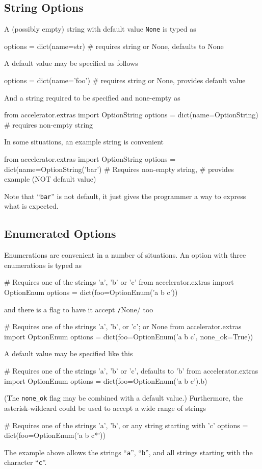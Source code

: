 \subsection{String Options}
A (possibly empty) string with default value \texttt{None} is typed as
\begin{python}
options = dict(name=str)     # requires string or None, defaults to None
\end{python}
A default value may be specified as follows
\begin{python}
options = dict(name='foo')   # requires string or None, provides default value
\end{python}
And a string required to be specified and none-empty as
\begin{python}
from accelerator.extras import OptionString
options = dict(name=OptionString)       # requires non-empty string
\end{python}
In some situations, an example string is convenient
\begin{python}
from accelerator.extras import OptionString
options = dict(name=OptionString('bar') # Requires non-empty string,
                                        # provides example (NOT default value)
\end{python}
Note that ``\texttt{bar}'' is not default, it just gives the
programmer a way to express what is expected.



\subsection{Enumerated Options}
Enumerations are convenient in a number of situations.  An option with
three enumerations is typed as
\begin{python}
# Requires one of the strings 'a', 'b' or 'c'
from accelerator.extras import OptionEnum
options = dict(foo=OptionEnum('a b c'))
\end{python}
and there is a flag to have it accept \texttt/None/ too
\begin{python}
# Requires one of the strings 'a', 'b', or 'c'; or None
from accelerator.extras import OptionEnum
options = dict(foo=OptionEnum('a b c', none_ok=True))
\end{python}
A default value may be specified like this
\begin{python}
# Requires one of the strings 'a', 'b' or 'c', defaults to 'b'
from accelerator.extras import OptionEnum
options = dict(foo=OptionEnum('a b c').b)
\end{python}
(The \texttt{none\_ok} flag may be combined with a default value.)
Furthermore, the asterisk-wildcard could be used to accept a wide
range of strings
\begin{python}
# Requires one of the strings 'a', 'b', or any string starting with 'c'
options = dict(foo=OptionEnum('a b c*'))
\end{python}
The example above allows the strings ``\texttt{a}'', ``\texttt{b}'',
and all strings starting with the character ``\texttt{c}''.



